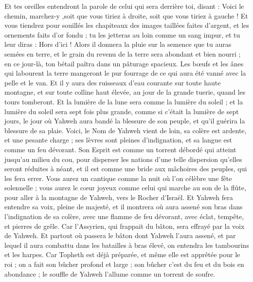 \begin{multicols}{2}
Et tes oreilles entendront la parole de celui qui sera derrière toi, disant : Voici le chemin, marchez-y ,soit que vous tiriez à droite, soit que vous tiriez à gauche !
Et vous tiendrez pour souillés les chapiteaux des images taillées faites d'argent, et les ornements faits d'or fondu ; tu les jetteras au loin comme un sang impur, et tu leur diras : Hors d'ici ! 
Alors il donnera la pluie sur la semence que tu auras semées en terre, et le grain du revenu de la terre sera abondant et bien nourri ; en ce jour-là, ton bétail paîtra dans un pâturage spacieux.
Les bœufs et les ânes qui labourent la terre mangeront le pur fourrage de ce qui aura été vanné avec la pelle et le van.
Et il y aura des ruisseaux d'eau courante sur toute haute montagne, et sur toute colline haut élevée, au jour de la grande tuerie, quand les tours tomberont.
Et la lumière de la lune sera comme la lumière du soleil ; et la lumière du soleil sera sept fois plus grande, comme si c'était la lumière de sept jours, le jour où Yahweh aura bandé la blessure de son peuple, et qu'il guérira la blessure de sa plaie.
Voici, le Nom de Yahweh vient de loin, sa colère est ardente, et une pesante charge ; ses lèvres sont pleines d'indignation, et sa langue est comme un feu dévorant.
Son Esprit est comme un torrent débordé qui atteint jusqu'au milieu du cou, pour disperser les nations d'une telle dispersion qu'elles seront réduites à néant, et il est comme une bride aux mâchoires des peuples, qui les fera errer.
Vous aurez un cantique comme la nuit où l'on célèbre une fête solennelle ; vous aurez le cœur joyeux comme celui qui marche au son de la flûte, pour aller à la montagne de Yahweh, vers le Rocher d'Israël.
Et Yahweh fera entendre sa voix, pleine de majesté, et il montrera où aura assené son bras dans l'indignation de sa colère, avec une flamme de feu dévorant, avec éclat, tempête, et pierres de grêle.
Car l'Assyrien, qui frappait du bâton, sera effrayé par la voix de Yahweh.
Et partout où passera le bâton dont Yahweh l'aura assené, et par lequel il aura combattu dans les batailles à bras élevé, on entendra les tambourins et les harpes.
Car Topheth est déjà préparée, et même elle est apprêtée pour le roi ; on a fait son bûcher profond et large ; son bûcher c'est du feu et du bois en abondance ; le souffle de Yahweh l'allume comme un torrent de soufre.

\end{multicols}
